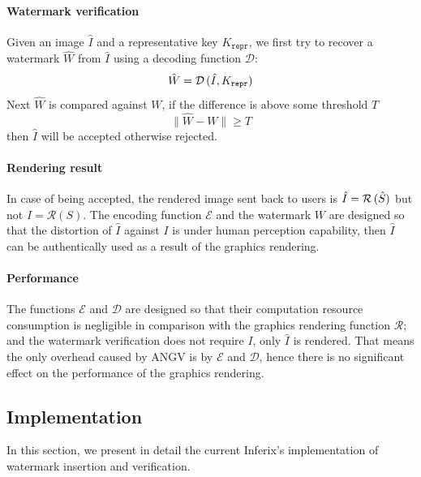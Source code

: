 \paragraph[Watermark verification]{Watermark verification}
Given an image $\hat{I}$ and a representative key $K_{\mathtt{repr}}$, we first try to recover a watermark $\hat{W}$ from $\hat{I}$ using a decoding function $\mathcal{D}$:
\begin{equation*}
    \hat{W} = \mathcal{D} \thinspace (\hat{I}, K_{\mathtt{repr}})
\end{equation*}
Next $\hat{W}$ is compared against $W$, if the difference is above some threshold $T$
\begin{equation*}
    \lVert \hat{W} - W \rVert \geq T
\end{equation*}
then $\hat{I}$ will be accepted otherwise rejected.

\paragraph[Rendering result]{Rendering result}
In case of being accepted, the rendered image sent back to users is $\hat{I} = \mathcal{R}\thinspace(\hat{S})$ but not $I = \mathcal{R}\left(S\right)$. The encoding function $\mathcal{E}$ and the watermark $W$ are designed so that the distortion of $\hat{I}$ against $I$ is under human perception capability, then $\hat{I}$ can be authentically used as a result of the graphics rendering.

\paragraph[Performance]{Performance}
The functions $\mathcal{E}$ and $\mathcal{D}$ are designed so that their computation resource consumption is negligible in comparison with the graphics rendering function $\mathcal{R}$; and the watermark verification does not require $I$, only $\hat{I}$ is rendered. That means the only overhead caused by ANGV is by $\mathcal{E}$ and $\mathcal{D}$, hence there is no significant effect on the performance of the graphics rendering.
 

\subsection[Implementation]{Implementation}
In this section, we present in detail the current Inferix's implementation of watermark insertion and verification.

